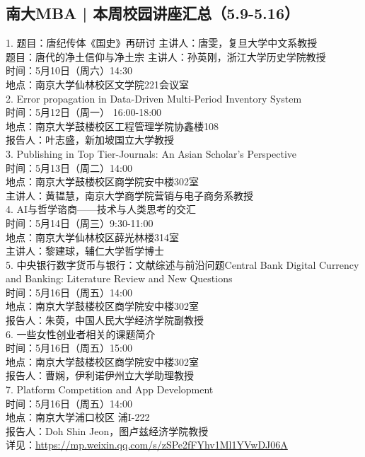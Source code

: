 \documentclass[letterpaper, 12pt]{article}
\begin{document}
\begin{multicols}{2}
\subsection{南大MBA | 本周校园讲座汇总（5.9-5.16）} %
1. 题目：唐纪传体《国史》再研讨 主讲人：唐雯，复旦大学中文系教授
\\题目：唐代的净土信仰与净土宗 主讲人：孙英刚，浙江大学历史学院教授
\\时间：5月10日（周六）14:30
\\ 地点：南京大学仙林校区文学院221会议室
\\2. Error propagation in Data-Driven Multi-Period Inventory System
\\时间：5月12日（周一） 16:00-18:00
\\地点：南京大学鼓楼校区工程管理学院协鑫楼108
\\报告人：叶志盛，新加坡国立大学教授
\\3. Publishing in Top Tier-Journals: An Asian Scholar’s Perspective
\\时间：5月13日（周二）14:00
\\地点：南京大学鼓楼校区商学院安中楼302室
\\主讲人：黄韫慧，南京大学商学院营销与电子商务系教授
\\4. AI与哲学谘商——技术与人类思考的交汇
\\时间：5月14日（周三）9:30-11:00
\\地点：南京大学仙林校区薛光林楼314室
\\主讲人：黎建球，辅仁大学哲学博士
\\5. 中央银行数字货币与银行：文献综述与前沿问题Central Bank Digital Currency and Banking: Literature Review and New Questions
\\时间：5月16日（周五）14:00
\\地点：南京大学鼓楼校区商学院安中楼302室
\\报告人：朱萸，中国人民大学经济学院副教授
\\6. 一些女性创业者相关的课题简介
\\时间：5月16日（周五）15:00
\\地点：南京大学鼓楼校区商学院安中楼302室
\\报告人：曹娴，伊利诺伊州立大学助理教授
\\7. Platform Competition and App Development
\\时间：5月16日（周五）14:00
\\地点：南京大学浦口校区 浦I-222
\\报告人：Doh Shin Jeon，图卢兹经济学院教授
\\详见：\url{https://mp.weixin.qq.com/s/zSPe2fFYhv1Ml1YVwDJ06A}


\end{multicols}
\end{document}
